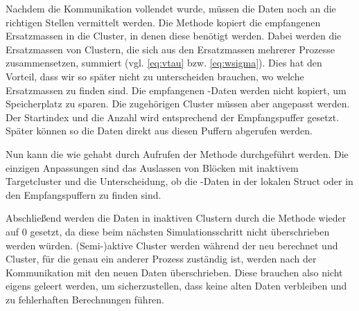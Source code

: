     Nachdem die Kommunikation vollendet wurde, müssen die Daten noch an die richtigen Stellen vermittelt werden. Die Methode  kopiert die empfangenen Ersatzmassen in die 
    Cluster, in denen diese benötigt werden. Dabei werden die Ersatzmassen von Clustern, die sich aus den Ersatzmassen mehrerer Prozesse zusammensetzen, summiert (vgl. \autoref{eq:vtau} bzw. 
    \autoref{eq:wsigma}). Dies hat den Vorteil, dass wir so später nicht zu unterscheiden brauchen, wo welche Ersatzmassen zu finden sind.
    Die empfangenen -Daten werden nicht kopiert, um Speicherplatz zu sparen. Die zugehörigen Cluster müssen aber angepasst werden. Der Startindex und die 
    Anzahl wird entsprechend der Empfangspuffer gesetzt. Später können so die Daten direkt aus diesen Puffern abgerufen werden. 
    
    
    Nun kann die \koppl wie gehabt durch Aufrufen der Methode  durchgeführt werden. Die einzigen Anpassungen sind das Auslassen von Blöcken mit inaktivem Targetcluster und die 
    Unterscheidung, ob die -Daten in der lokalen  Struct oder in den Empfangspuffern zu finden sind.
    
    Abschließend werden die Daten in inaktiven Clustern durch die Methode  wieder auf $0$ gesetzt, da diese beim nächsten Simulationsschritt nicht überschrieben
    werden würden. (Semi-)aktive Cluster werden während der \vorw neu berechnet und Cluster, für die genau ein anderer Prozess zuständig ist, werden nach der Kommunikation mit den neuen Daten 
    überschrieben. Diese brauchen also nicht eigens geleert werden, um sicherzustellen, dass keine alten Daten verbleiben und zu fehlerhaften Berechnungen führen.
    

